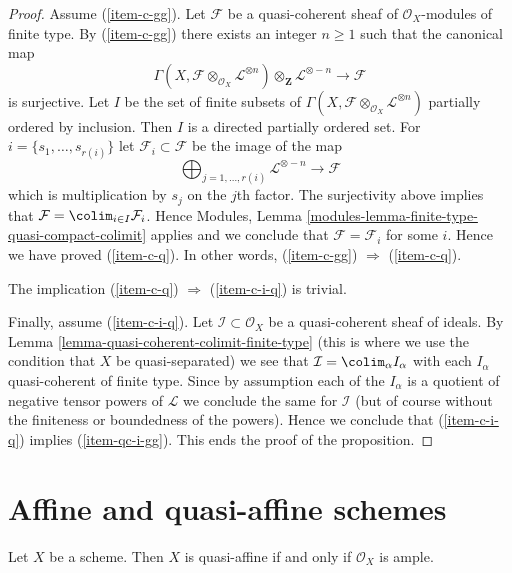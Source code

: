 \begin{proof}
\medskip\noindent
Assume (\ref{item-c-gg}). Let $\mathcal{F}$ be a quasi-coherent
sheaf of $\mathcal{O}_X$-modules of finite type.
By (\ref{item-c-gg}) there exists an integer $n \geq 1$ such that
the canonical map
$$
\Gamma(X, \mathcal{F} \otimes_{\mathcal{O}_X} \mathcal{L}^{\otimes n})
\otimes_{\mathbf{Z}} \mathcal{L}^{\otimes -n}
\longrightarrow
\mathcal{F}
$$
is surjective. Let $I$ be the set of finite subsets of
$\Gamma(X, \mathcal{F} \otimes_{\mathcal{O}_X} \mathcal{L}^{\otimes n})$
partially ordered by inclusion. Then $I$ is a directed partially ordered set.
For $i = \{s_1, \ldots, s_{r(i)}\}$ let $\mathcal{F}_i \subset \mathcal{F}$
be the image of the map
$$
\bigoplus\nolimits_{j = 1, \ldots, r(i)} \mathcal{L}^{\otimes -n}
\longrightarrow
\mathcal{F}
$$
which is multiplication by $s_j$ on the $j$th factor. The surjectivity above
implies that $\mathcal{F} = \colim_{i \in I} \mathcal{F}_i$.
Hence Modules, Lemma \ref{modules-lemma-finite-type-quasi-compact-colimit}
applies and we conclude that
$\mathcal{F} = \mathcal{F}_i$ for some $i$.
Hence we have proved (\ref{item-c-q}). In other words,
(\ref{item-c-gg}) $\Rightarrow$ (\ref{item-c-q}).

\medskip\noindent
The implication (\ref{item-c-q}) $\Rightarrow$ (\ref{item-c-i-q}) is trivial.

\medskip\noindent
Finally, assume (\ref{item-c-i-q}).
Let $\mathcal{I} \subset \mathcal{O}_X$ be a quasi-coherent sheaf
of ideals. By Lemma \ref{lemma-quasi-coherent-colimit-finite-type}
(this is where we use the condition that $X$ be quasi-separated)
we see that $\mathcal{I} = \colim_\alpha I_\alpha$ with
each $I_\alpha$ quasi-coherent of finite type. Since by assumption each of
the $I_\alpha$ is a quotient of negative tensor powers of
$\mathcal{L}$ we conclude the same for $\mathcal{I}$ (but of course
without the finiteness or boundedness of the powers). Hence
we conclude that (\ref{item-c-i-q}) implies (\ref{item-qc-i-gg}).
This ends the proof of the proposition.
\end{proof}




\section{Affine and quasi-affine schemes}
\label{section-affine-quasi-affine}

\begin{lemma}
\label{lemma-quasi-affine-O-ample}
Let $X$ be a scheme.
Then $X$ is quasi-affine if and only if $\mathcal{O}_X$ is ample.
\end{lemma}

